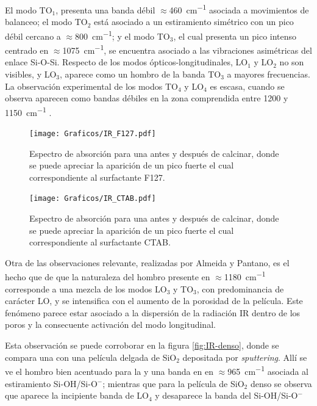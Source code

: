 		El modo TO$_1$, presenta una banda débil $\approx$\SI{460}{\cm^{-1}} asociada a movimientos de balanceo; el modo TO$_2$ está asociado a un estiramiento simétrico con un pico débil cercano a $\approx$\SI{800}{\cm^{-1}}; y el modo TO$_3$, el cual presenta un pico intenso centrado en $\approx$\SI{1075}{\cm^{-1}}, se encuentra asociado a las vibraciones asimétricas del enlace Si-O-Si. Respecto de los modos ópticos-longitudinales, LO$_1$ y LO$_2$ no son visibles, y LO$_3$, aparece como un hombro de la banda TO$_3$ a mayores frecuencias. La observación experimental de los modos TO$_4$ y LO$_4$ es escasa, cuando se observa aparecen como bandas débiles en la zona comprendida entre 1200 y \SI{1150}{\cm^{-1}} \cite{Pai1986,Grosse1986}.
		
				\begin{figure}[!ht]
						\begin{center}
						\texttt{[image: Graficos/IR\_F127.pdf]}
						\caption[FTIR para una \pdmF.]{Espectro de absorción para una \pdmF\space antes y después de calcinar, donde se puede apreciar la aparición de un pico fuerte el cual correspondiente al surfactante F127.}
						\label{fig:IR_F127_calciando}
						\end{center}
						\end{figure}
				
				\begin{figure}[!ht]
						\begin{center}
						\texttt{[image: Graficos/IR\_CTAB.pdf]}
						\caption[FTIR para una \pdmC.]{Espectro de absorción para una \pdmC\space antes y después de calcinar, donde se puede apreciar la aparición de un pico fuerte el cual correspondiente al surfactante CTAB.}
						\label{fig:IR_CTAB_calcinado}
						\end{center}
						\end{figure}

		Otra de las observaciones relevante, realizadas por Almeida y Pantano\cite{Almeida1990}, es el hecho que de que la naturaleza del hombro presente en $\approx$\SI{1180}{\cm^{-1}}	corresponde a una mezcla de los modos LO$_3$ y TO$_3$, con predominancia de carácter LO, y se intensifica con el aumento de la porosidad de la película. Este fenómeno parece estar asociado a la dispersión de la radiación IR dentro de los poros y la consecuente activación del modo longitudinal.

		Esta observación se puede corroborar en la figura \ref{fig:IR-denso}, donde se compara una \pdm\space con una película delgada de SiO$_2$ depositada por \textit{sputtering}.  Allí se ve el hombro bien acentuado para la \pdm\space y una banda en en $\approx$\SI{965}{\cm^{-1}} asociada al estiramiento Si-OH/Si-O$^-$; mientras que para la película de SiO$_2$ denso se observa que aparece la incipiente banda de LO$_4$ y desaparece la banda del Si-OH/Si-O$^-$
				
